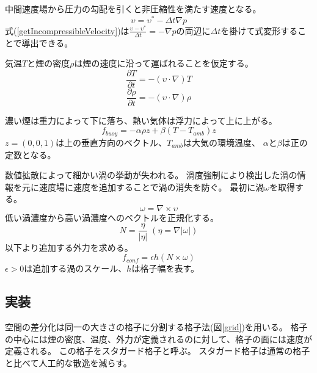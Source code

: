 中間速度場から圧力の勾配を引くと非圧縮性を満たす速度となる。
\begin{equation}
\label{getIncompressibleVelocity}
\upsilon = \upsilon^* - \Delta t \nabla p
\end{equation}
式(\ref{getIncompressibleVelocity})は$\frac{\upsilon - \upsilon^* }{\Delta t} = - \nabla p$の両辺に$\Delta t$を掛けて式変形することで導出できる。

気温$T$と煙の密度$\rho$は煙の速度に沿って運ばれることを仮定する。
\begin{equation}
\label{temperature}
\frac{\partial T}{\partial t} = - ( \upsilon \cdot \nabla)T
\end{equation}
\begin{equation}
\label{temperature}
\frac{\partial \rho}{\partial t} = - ( \upsilon \cdot \nabla)\rho
\end{equation}

濃い煙は重力によって下に落ち、熱い気体は浮力によって上に上がる。
\begin{equation}
\label{buoyancy}
f_{buoy}=-\alpha\rho z + \beta(T-T_{amb}) z
\end{equation} 
$z=(0,0,1)$は上の垂直方向のベクトル、$T_{amb}$は大気の環境温度、
$\alpha$と$\beta$は正の定数となる。

数値拡散によって細かい渦の挙動が失われる。
渦度強制により検出した渦の情報を元に速度場に速度を追加することで渦の消失を防ぐ。
最初に渦$\omega$を取得する。
\begin{equation}
\label{volticity}
\omega=\nabla \times \upsilon
\end{equation}
低い渦濃度から高い渦濃度へのベクトルを正規化する。
\begin{equation}
\label{normalizeVelocityLocation}
N=\frac{\eta}{|\eta|}\;(\eta=\nabla|\omega|)
\end{equation}
以下より追加する外力を求める。
\begin{equation}
\label{confinementForce}
f_{conf}=\epsilon h (N \times \omega)
\end{equation}
$\epsilon > 0$は追加する渦のスケール、$h$は格子幅を表す。
\subsection{実装}

空間の差分化は同一の大きさの格子に分割する格子法(図\ref{grid})を用いる。
格子の中心には煙の密度、温度、外力が定義されるのに対して、格子の面には速度が定義される。
この格子をスタガード格子と呼ぶ。
スタガード格子は通常の格子と比べて人工的な散逸を減らす。

